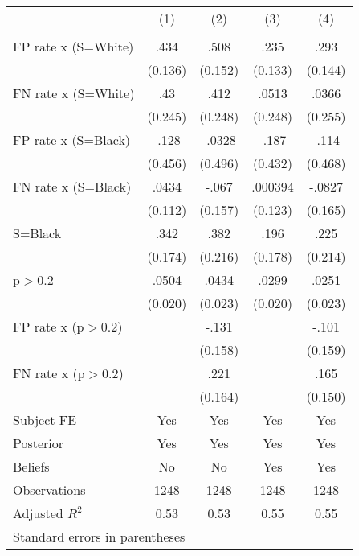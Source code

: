 \begin{tabular}{l*{4}{c}}
\hline\hline
                &\multicolumn{1}{c}{(1)}&\multicolumn{1}{c}{(2)}&\multicolumn{1}{c}{(3)}&\multicolumn{1}{c}{(4)}\\
                &\multicolumn{1}{c}{}&\multicolumn{1}{c}{}&\multicolumn{1}{c}{}&\multicolumn{1}{c}{}\\
\hline
FP rate x (S=White)&     .434&     .508&     .235&     .293\\
                &  (0.136)&  (0.152)&  (0.133)&  (0.144)\\
FN rate x (S=White)&      .43&     .412&    .0513&    .0366\\
                &  (0.245)&  (0.248)&  (0.248)&  (0.255)\\
FP rate x (S=Black)&    -.128&   -.0328&    -.187&    -.114\\
                &  (0.456)&  (0.496)&  (0.432)&  (0.468)\\
FN rate x (S=Black)&    .0434&    -.067&  .000394&   -.0827\\
                &  (0.112)&  (0.157)&  (0.123)&  (0.165)\\
S=Black         &     .342&     .382&     .196&     .225\\
                &  (0.174)&  (0.216)&  (0.178)&  (0.214)\\
p$>$0.2         &    .0504&    .0434&    .0299&    .0251\\
                &  (0.020)&  (0.023)&  (0.020)&  (0.023)\\
FP rate x (p$>$0.2)&         &    -.131&         &    -.101\\
                &         &  (0.158)&         &  (0.159)\\
FN rate x (p$>$0.2)&         &     .221&         &     .165\\
                &         &  (0.164)&         &  (0.150)\\
Subject FE      &      Yes&      Yes&      Yes&      Yes\\
Posterior       &      Yes&      Yes&      Yes&      Yes\\
Beliefs         &       No&       No&      Yes&      Yes\\
\hline
Observations    &     1248&     1248&     1248&     1248\\
Adjusted \(R^{2}\)&     0.53&     0.53&     0.55&     0.55\\
\hline\hline
\multicolumn{5}{l}{\footnotesize Standard errors in parentheses}\\
\end{tabular}
